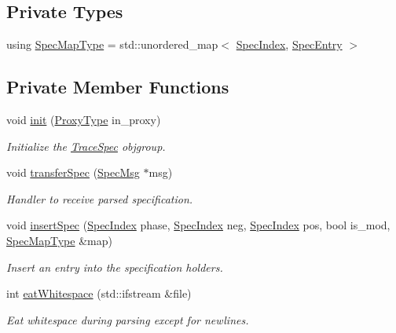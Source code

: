 \subsection*{Private Types}
\begin{DoxyCompactItemize}
\item 
using \hyperlink{structvt_1_1trace_1_1file__spec_1_1_trace_spec_a155d6b881e8d69a4644823789788ce5c}{Spec\+Map\+Type} = std\+::unordered\+\_\+map$<$ \hyperlink{structvt_1_1trace_1_1file__spec_1_1_trace_spec_a4dd2e8fb971930351812d0f286baece2}{Spec\+Index}, \hyperlink{structvt_1_1trace_1_1file__spec_1_1_trace_spec_1_1_spec_entry}{Spec\+Entry} $>$
\end{DoxyCompactItemize}
\subsection*{Private Member Functions}
\begin{DoxyCompactItemize}
\item 
void \hyperlink{structvt_1_1trace_1_1file__spec_1_1_trace_spec_aa919658e5981872e86e4aa2ed1186f46}{init} (\hyperlink{structvt_1_1trace_1_1file__spec_1_1_trace_spec_a26160cff9bb5115866943ed823405f1f}{Proxy\+Type} in\+\_\+proxy)
\begin{DoxyCompactList}\small\item\em Initialize the {\ttfamily \hyperlink{structvt_1_1trace_1_1file__spec_1_1_trace_spec}{Trace\+Spec}} objgroup. \end{DoxyCompactList}\item 
void \hyperlink{structvt_1_1trace_1_1file__spec_1_1_trace_spec_a4b3dca3408cbcc932fa55b87f086a42b}{transfer\+Spec} (\hyperlink{structvt_1_1trace_1_1file__spec_1_1_trace_spec_1_1_spec_msg}{Spec\+Msg} $\ast$msg)
\begin{DoxyCompactList}\small\item\em Handler to receive parsed specification. \end{DoxyCompactList}\item 
void \hyperlink{structvt_1_1trace_1_1file__spec_1_1_trace_spec_af9bbdd67b14a25bee5ffa43024c9768c}{insert\+Spec} (\hyperlink{structvt_1_1trace_1_1file__spec_1_1_trace_spec_a4dd2e8fb971930351812d0f286baece2}{Spec\+Index} phase, \hyperlink{structvt_1_1trace_1_1file__spec_1_1_trace_spec_a4dd2e8fb971930351812d0f286baece2}{Spec\+Index} neg, \hyperlink{structvt_1_1trace_1_1file__spec_1_1_trace_spec_a4dd2e8fb971930351812d0f286baece2}{Spec\+Index} pos, bool is\+\_\+mod, \hyperlink{structvt_1_1trace_1_1file__spec_1_1_trace_spec_a155d6b881e8d69a4644823789788ce5c}{Spec\+Map\+Type} \&map)
\begin{DoxyCompactList}\small\item\em Insert an entry into the specification holders. \end{DoxyCompactList}\item 
int \hyperlink{structvt_1_1trace_1_1file__spec_1_1_trace_spec_a372568633fa39959d508984e5eb2ff96}{eat\+Whitespace} (std\+::ifstream \&file)
\begin{DoxyCompactList}\small\item\em Eat whitespace during parsing except for newlines. \end{DoxyCompactList}\end{DoxyCompactItemize}

